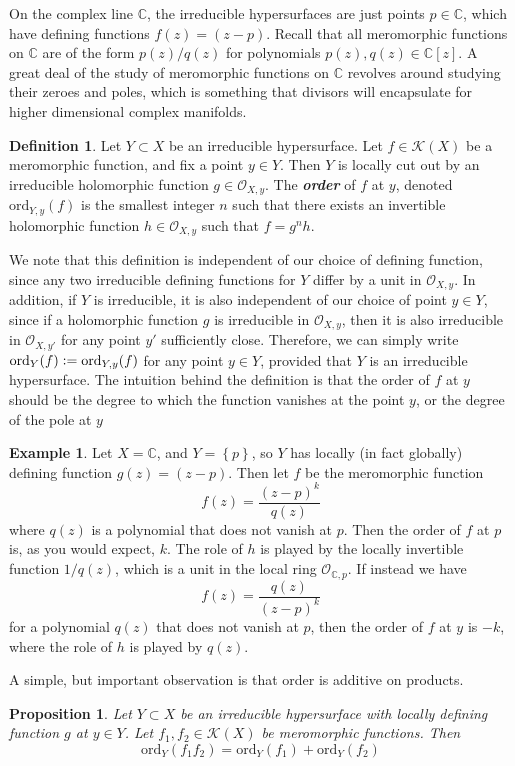 \documentclass[psamsfonts, 12pt]{amsart}
\newtheorem{prop}[thm]{Proposition}
\theoremstyle{definition}
\newtheorem{defn}[thm]{Definition}
\newtheorem{exmp}[thm]{Example}
\theoremstyle{remark}
\renewcommand{\O}{\mathcal{O}}
\newcommand{\ib}[1]{\textbf{\textit{#1}}}
\newcommand{\C}{\mathbb{C}}
\newcommand{\set}[1]{\left\lbrace #1 \right\rbrace}
\newcommand{\defeq}{\vcentcolon=}
\begin{document}
On the complex line $\C$, the irreducible hypersurfaces are just points $p \in \C$,
which have defining functions $f(z) = (z-p)$. Recall that all meromorphic functions
on $\C$ are of the form $p(z)/q(z)$ for polynomials $p(z),q(z) \in \C[z]$. A great
deal of the study of meromorphic functions on $\C$ revolves around studying their zeroes
and poles, which is something that divisors will encapsulate for higher dimensional
complex manifolds.
%
\begin{defn}
Let $Y \subset X$ be an irreducible hypersurface. Let $f \in \mathcal{K}(X)$ be a
meromorphic function, and fix a point $y \in Y$. Then $Y$ is locally cut out by an
irreducible holomorphic function $g \in \O_{X,y}$. The \ib{order} of $f$ at
$y$, denoted $\mathrm{ord}_{Y,y}(f)$ is the smallest integer $n$ such that there exists
an invertible holomorphic function $h \in \O_{X,y}$ such that $f= g^nh$.
\end{defn}
%
We note that this definition is independent of our choice of defining function, since
any two irreducible defining functions for $Y$ differ by a unit in $\O_{X,y}$. In
addition, if $Y$ is irreducible, it is also independent of our choice of point $y \in Y$,
since if a holomorphic function $g$ is irreducible in $\O_{X,y}$, then it is also
irreducible in $\O_{X,y'}$ for any point $y'$ sufficiently close. Therefore, we can
simply write $\mathrm{ord}_Y(f) \defeq \mathrm{ord}_{Y,y}(f)$ for any point $y \in Y$,
provided that $Y$ is an irreducible hypersurface. The intuition behind the definition
is that the order of $f$ at $y$ should be the degree to which the function vanishes
at the point $y$, or the degree of the pole at $y$
%
\begin{exmp}
Let $X = \C$, and $Y = \set{p}$, so $Y$ has locally (in fact globally) defining
function $g(z) = (z-p)$. Then let $f$ be the meromorphic function
\[
f(z) = \frac{(z-p)^k}{q(z)}
\]
where $q(z)$ is a polynomial that does not vanish at $p$.
Then the order of $f$ at $p$ is, as you would expect, $k$. The role of $h$
is played by the locally invertible function $1/q(z)$, which is a unit in the local
ring $\O_{\C,p}$. If instead we have
\[
f(z) = \frac{q(z)}{(z-p)^k}
\]
for a polynomial $q(z)$ that does not vanish at $p$, then the order of $f$
at $y$ is $-k$, where the role of $h$ is played by $q(z)$.
\end{exmp}
%
A simple, but important observation is that order is additive on products.
%
\begin{prop}
Let $Y \subset X$ be an irreducible hypersurface with locally defining function
$g$ at $y \in Y$. Let $f_1,f_2 \in \mathcal{K}(X)$ be meromorphic functions. Then
\[
\mathrm{ord}_Y(f_1f_2) = \mathrm{ord}_Y(f_1) + \mathrm{ord}_Y(f_2)
\]
\end{prop}
\end{document}
